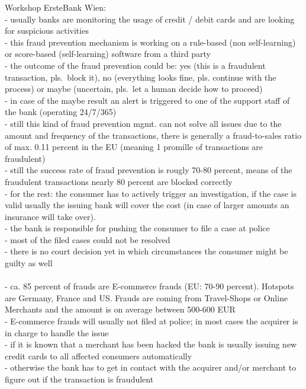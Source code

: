 Workshop ErsteBank Wien: \\
- usually banks are monitoring the usage of credit / debit cards and are looking for suspicious activities \\
- this fraud prevention mechanism is working on a rule-based (non self-learning) or score-based (self-learning) software from a third party \\
- the outcome of the fraud prevention could be: yes (this is a fraudulent transaction, pls.\ block it), no (everything looks fine, pls. continue with the process) or maybe (uncertain, pls.\ let a human decide how to proceed) \\
- in case of the maybe result an alert is triggered to one of the support staff of the bank (operating 24/7/365) \\
- still this kind of fraud prevention mgmt. can not solve all issues due to the amount and frequency of the transactions, there is generally a
fraud-to-sales ratio of max. 0.11 percent in the EU (meaning 1 promille of transactions are fraudulent) \\
- still the success rate of fraud prevention is rougly 70-80 percent, means of the fraudulent transactions nearly 80 percent are blocked correctly \\
- for the rest: the consumer has to actively trigger an investigation, if the case is valid usually the issuing bank will cover the cost (in case of larger amounts an insurance will take over). \\
- the bank is responsible for pushing the consumer to file a case at police \\
- most of the filed cases could not be resolved \\
- there is no court decision yet in which circumstances the consumer might be guilty as well \\
\\
- ca. 85 percent of frauds are E-commerce frauds (EU: 70-90 percent). Hotspots are Germany, France and US. Frauds are coming from Travel-Shops or Online Merchants and the amount is on average between 500-600 EUR \\
- E-commerce frauds will usually not filed at police; in most cases the acquirer is in charge to handle the issue \\
- if it is known that a merchant has been hacked the bank is usually issuing new credit cards to all affected consumers automatically \\
- otherwise the bank has to get in contact with the acquirer and/or merchant to figure out if the transaction is fraudulent \\
